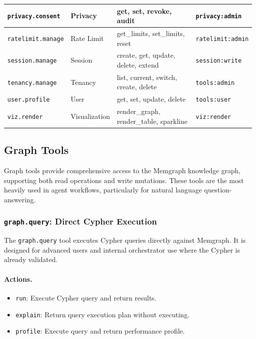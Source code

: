 \begin{longtable}{llp{4cm}l}
    \midrule
    \texttt{privacy.consent} & Privacy & get, set, revoke, audit & \texttt{privacy:admin} \\
    \midrule
    \texttt{ratelimit.manage} & Rate Limit & get\_limits, set\_limits, reset & \texttt{ratelimit:admin} \\
    \midrule
    \texttt{session.manage} & Session & create, get, update, delete, extend & \texttt{session:write} \\
    \midrule
    \texttt{tenancy.manage} & Tenancy & list, current, switch, create, delete & \texttt{tools:admin} \\
    \midrule
    \texttt{user.profile} & User & get, set, update, delete & \texttt{tools:user} \\
    \midrule
    \texttt{viz.render} & Visualization & render\_graph, render\_table, sparkline & \texttt{viz:render} \\
\end{longtable}

\subsection{Graph Tools}
\label{subsec:graph-tools}

Graph tools provide comprehensive access to the Memgraph knowledge graph, supporting both read operations and write mutations. These tools are the most heavily used in agent workflows, particularly for natural language question-answering.

\subsubsection{\texttt{graph.query}: Direct Cypher Execution}

The \texttt{graph.query} tool executes Cypher queries directly against Memgraph. It is designed for advanced users and internal orchestrator use where the Cypher is already validated.

\paragraph{Actions.}
\begin{itemize}
    \item \texttt{run}: Execute Cypher query and return results.
    \item \texttt{explain}: Return query execution plan without executing.
    \item \texttt{profile}: Execute query and return performance profile.
\end{itemize}

